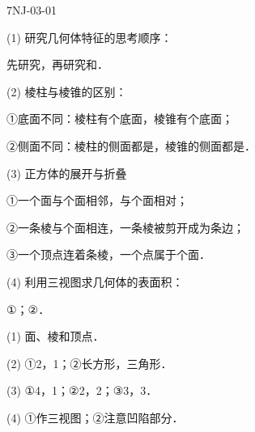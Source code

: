 
\begin{defproblem}{7NJ-03-01}%
\begin{onlyproblem}%
(1) 研究几何体特征的思考顺序：

先研究\underline{\hspace*{2cm}}，再研究\underline{\hspace*{2cm}}和\underline{\hspace*{2cm}}．

(2) 棱柱与棱锥的区别：

①底面不同：棱柱有\underline{\hspace*{2cm}}个底面，棱锥有\underline{\hspace*{2cm}}个底面；

②侧面不同：棱柱的侧面都是\underline{\hspace*{2cm}}，棱锥的侧面都是\underline{\hspace*{2cm}}．

(3) 正方体的展开与折叠

①一个面与\underline{\hspace*{2cm}}个面相邻，与\underline{\hspace*{2cm}}个面相对；

②一条棱与\underline{\hspace*{2cm}}个面相连，一条棱被剪开成为\underline{\hspace*{2cm}}条边；

③一个顶点连着\underline{\hspace*{2cm}}条棱，一个点属于\underline{\hspace*{2cm}}个面．

(4) 利用三视图求几何体的表面积：

①\underline{\hspace*{2cm}}；②\underline{\hspace*{2cm}}．
\end{onlyproblem}%
\begin{onlysolution}%
\begin{solution}%
(1) 面、棱和顶点．

(2) ①2，1；②长方形，三角形．

(3) ①4，1；②2，2；③3，3．

(4) ①作三视图；②注意凹陷部分．
\end{solution}%
\end{onlysolution}%
\end{defproblem}





